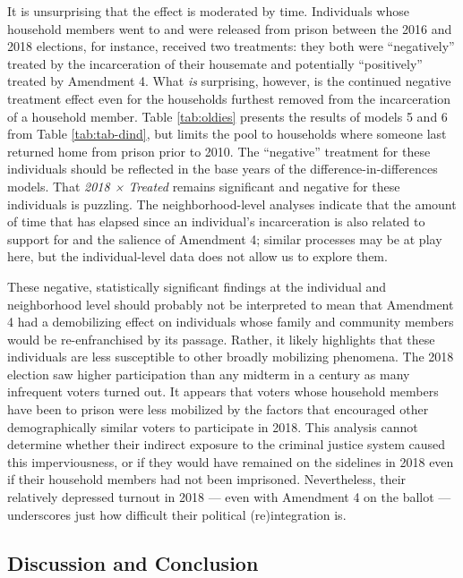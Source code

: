 \documentclass[
  12pt,
]{article}
\begin{document}
It is unsurprising that the effect is moderated by time. Individuals whose household members went to and were released from prison between the 2016 and 2018 elections, for instance, received two treatments: they both were ``negatively'' treated by the incarceration of their housemate and potentially ``positively'' treated by Amendment 4. What \emph{is} surprising, however, is the continued negative treatment effect even for the households furthest removed from the incarceration of a household member. Table \ref{tab:oldies} presents the results of models 5 and 6 from Table \ref{tab:tab-dind}, but limits the pool to households where someone last returned home from prison prior to 2010. The ``negative'' treatment for these individuals should be reflected in the base years of the difference-in-differences models. That \emph{2018 × Treated} remains significant and negative for these individuals is puzzling. The neighborhood-level analyses indicate that the amount of time that has elapsed since an individual's incarceration is also related to support for and the salience of Amendment 4; similar processes may be at play here, but the individual-level data does not allow us to explore them.

\begin{singlespace}

\end{singlespace}

These negative, statistically significant findings at the individual and neighborhood level should probably not be interpreted to mean that Amendment 4 had a demobilizing effect on individuals whose family and community members would be re-enfranchised by its passage. Rather, it likely highlights that these individuals are less susceptible to other broadly mobilizing phenomena. The 2018 election saw higher participation than any midterm in a century as many infrequent voters turned out. It appears that voters whose household members have been to prison were less mobilized by the factors that encouraged other demographically similar voters to participate in 2018. This analysis cannot determine whether their indirect exposure to the criminal justice system caused this imperviousness, or if they would have remained on the sidelines in 2018 even if their household members had not been imprisoned. Nevertheless, their relatively depressed turnout in 2018 --- even with Amendment 4 on the ballot --- underscores just how difficult their political (re)integration is.

\hypertarget{discussion-and-conclusion}{%
\subsection*{Discussion and Conclusion}\label{discussion-and-conclusion}}
\end{document}
